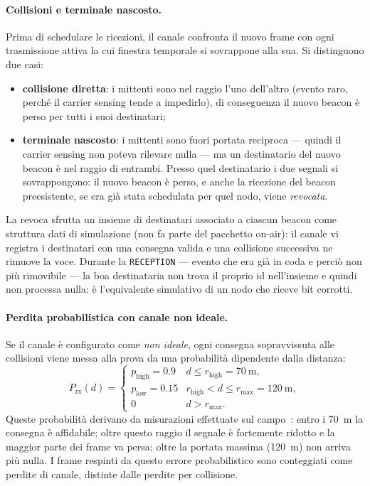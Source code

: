\paragraph{Collisioni e terminale nascosto.} Prima di schedulare le ricezioni, il canale
confronta il nuovo frame con ogni trasmissione attiva la cui finestra temporale si
sovrappone alla sua. Si distinguono due casi:
\begin{itemize}[leftmargin=1.4em,nosep]
  \item \textbf{collisione diretta}: i mittenti sono nel raggio l'uno dell'altro
  (evento raro, perch\'e il carrier sensing tende a impedirlo), di conseguenza il nuovo beacon \`e
  perso per tutti i suoi destinatari;
  \item \textbf{terminale nascosto}: i mittenti sono fuori portata reciproca --- quindi
  il carrier sensing non poteva rilevare nulla --- ma un destinatario del nuovo beacon
  \`e nel raggio di entrambi. Presso quel destinatario i due segnali si sovrappongono:
  il nuovo beacon \`e perso, e anche la ricezione del beacon preesistente, se era gi\`a
  stata schedulata per quel nodo, viene \emph{revocata}.
\end{itemize}
La revoca sfrutta un insieme di destinatari associato a ciascun beacon
come struttura dati di simulazione (non fa parte del pacchetto on-air): il canale vi
registra i destinatari con una consegna valida e una collisione successiva ne rimuove la
voce. Durante la \texttt{RECEPTION} --- evento che era gi\`a in coda e perci\`o non pi\`u rimovibile --- 
la boa destinataria non trova il proprio id nell'insieme e quindi non processa nulla: \`e l'equivalente
simulativo di un nodo che riceve bit corrotti.

\paragraph{Perdita probabilistica con canale non ideale.} Se il canale \`e configurato
come \emph{non ideale}, ogni consegna sopravvissuta alle collisioni viene
messa alla prova da una probabilit\`a dipendente dalla distanza:
\begin{equation}
  P_{\text{rx}}(d) =
  \begin{cases}
    p_{\text{high}} = 0.9 & d \le r_{\text{high}} = \SI{70}{\metre},\\[2pt]
    p_{\text{low}} = 0.15 & r_{\text{high}} < d \le r_{\text{max}} = \SI{120}{\metre},\\[2pt]
    0 & d > r_{\text{max}}.
  \end{cases}
  \label{eq:delivery-prob}
\end{equation}
Queste probabilit\`a derivano da misurazioni effettuate sul campo~\cite{prosafe}: entro i \SI{70}{\metre} la consegna
\`e affidabile; oltre questo raggio il segnale \`e fortemente ridotto e la maggior parte dei
frame va persa; oltre la portata massima (\SI{120}{\metre}) non arriva pi\`u nulla. I frame respinti da questo errore probabilistico
sono conteggiati come perdite di canale, distinte dalle perdite per collisione.

